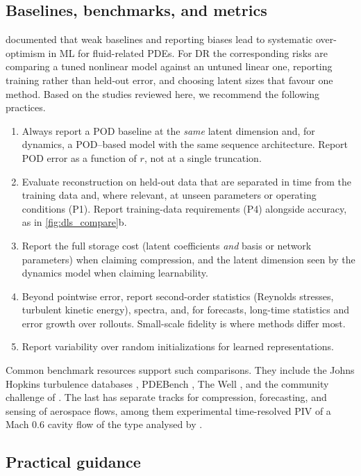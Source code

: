 \subsection{Baselines, benchmarks, and metrics}

\textcite{mcgreivy2024weak} documented that weak baselines and reporting biases
lead to systematic over-optimism in ML for fluid-related PDEs. For DR the
corresponding risks are comparing a tuned nonlinear model against an untuned
linear one, reporting training rather than held-out error, and choosing
latent sizes that favour one method. Based on the studies reviewed here, we
recommend the following practices.
\begin{enumerate}[leftmargin=2em,itemsep=2pt]
  \item Always report a POD baseline at the \emph{same} latent dimension and,
  for dynamics, a POD--based model with the same sequence architecture. Report
  POD error as a function of $r$, not at a single truncation.
  \item Evaluate reconstruction on held-out data that are separated in time
  from the training data and, where relevant, at unseen parameters or
  operating conditions (P1). Report training-data requirements (P4) alongside
  accuracy, as in \cref{fig:dls_compare}b.
  \item Report the full storage cost (latent coefficients \emph{and} basis or
  network parameters) when claiming compression, and the latent dimension seen
  by the dynamics model when claiming learnability.
  \item Beyond pointwise error, report second-order statistics (Reynolds
  stresses, turbulent kinetic energy), spectra, and, for forecasts, long-time
  statistics and error growth over rollouts. Small-scale fidelity is where
  methods differ most.
  \item Report variability over random initializations for learned
  representations.
\end{enumerate}
Common benchmark resources support such comparisons. They include the
Johns Hopkins turbulence databases \parencite{li2008jhtdb}, PDEBench
\parencite{takamoto2022pdebench}, The Well \parencite{ohana2024well}, and the
community challenge of \textcite{schmidt2026challenge}. The last has
separate tracks for compression, forecasting, and sensing of aerospace flows,
among them experimental time-resolved PIV of a Mach 0.6 cavity flow of the type
analysed by \textcite{zhang2020samm}.

\subsection{Practical guidance}

